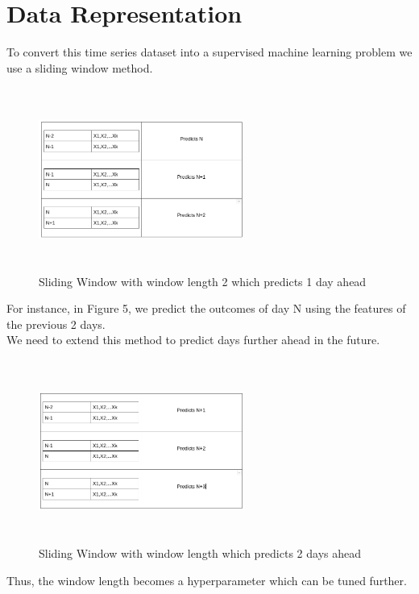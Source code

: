 \documentclass[12pt,a4paper]{article}
\begin{document}
\section*{Data Representation}
To convert this time series dataset into a supervised machine 
learning problem we use a sliding window method. 
\begin{figure}[H]
    \centering
    \includegraphics[width=0.6\textwidth,height=60mm]{images/sliding_window.png}
    \caption{Sliding Window with window length 2 which predicts 1 day ahead}
\end{figure}
For instance, in Figure 5, we predict the outcomes of day N using the features of the previous
2 days. 
\\
We need to extend this method to predict days further ahead in the future.
\begin{figure}[H]
    \centering
    \includegraphics[width=0.6\textwidth,height=60mm]{images/sliding_window_2.png}
    \caption{Sliding Window with window length which predicts 2 days ahead}
\end{figure}
Thus, the window length becomes a hyperparameter which can be tuned further.
\end{document}
